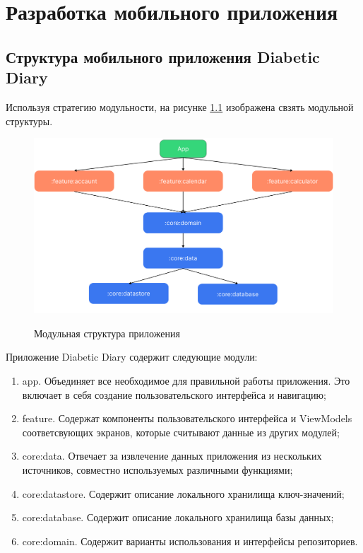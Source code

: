 \chapter{Разработка мобильного приложения}\label{Bib_chapter}


\section{Структура мобильного приложения Diabetic Diary}

Используя стратегию модульности, на рисунке \ref{fig:AppModul} изображена свзять модульной структуры.

\begin{figure}[h!]
    \begin{center}
        \includegraphics[width=0.8\hsize]{fig/AppModul.png}\\[2mm]
        \caption{Модульная структура приложения}\label{fig:AppModul}
    \end{center}
\end{figure}

Приложение Diabetic Diary содержит следующие модули:
\begin{enumerate}
    \item app. Объединяет все необходимое для правильной работы приложения. Это включает в себя создание пользовательского интерфейса и навигацию;
    \item feature. Содержат компоненты пользовательского интерфейса и ViewModels соответсвующих экранов, которые считывают данные из других модулей;
    \item core:data. Отвечает за извлечение данных приложения из нескольких источников, совместно используемых различными функциями;
    \item core:datastore.  Содержит описание локального хранилища ключ-значений;
    \item core:database. Содержит описание локального хранилища базы данных; 
    \item core:domain. Содержит варианты использования и интерфейсы репозиториев.
\end{enumerate}



